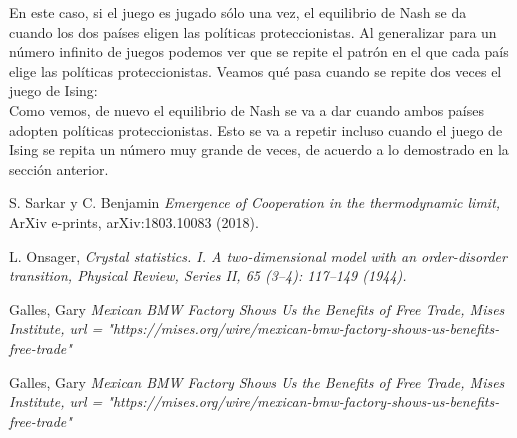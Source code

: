 \documentclass[letterpaper,12pt,oneside]{book}
\begin{document}
En este caso, si el juego es jugado s\'olo una vez, el equilibrio de Nash se da cuando los dos pa\'ises eligen las pol\'iticas proteccionistas. Al generalizar para un n\'umero infinito de juegos podemos ver que se repite el patr\'on en el que cada pa\'is elige las pol\'iticas proteccionistas. 
Veamos qu\'e pasa cuando se repite dos veces el juego de Ising:\\
%
Como vemos, de nuevo el equilibrio de Nash se va a dar cuando ambos pa\'ises adopten pol\'iticas proteccionistas. Esto se va a repetir incluso cuando el juego de Ising se repita un n\'umero muy grande de veces, de acuerdo a lo demostrado en la secci\'on anterior.
\begin{thebibliography}{99}




  S. Sarkar y C. Benjamin {\it Emergence of Cooperation in the thermodynamic limit,} ArXiv e-prints, arXiv:1803.10083 (2018).

 L. Onsager, \it{Crystal statistics. I. A two-dimensional model with an order-disorder transition}, Physical Review, Series II, 65 (3–4): 117–149 (1944).

 Galles, Gary \it{Mexican BMW Factory Shows Us the Benefits of Free Trade, } Mises Institute, url  = "https://mises.org/wire/mexican-bmw-factory-shows-us-benefits-free-trade"

 Galles, Gary \it{Mexican BMW Factory Shows Us the Benefits of Free Trade, } Mises Institute, url  = "https://mises.org/wire/mexican-bmw-factory-shows-us-benefits-free-trade"

\end{thebibliography}




  
\end{document}
